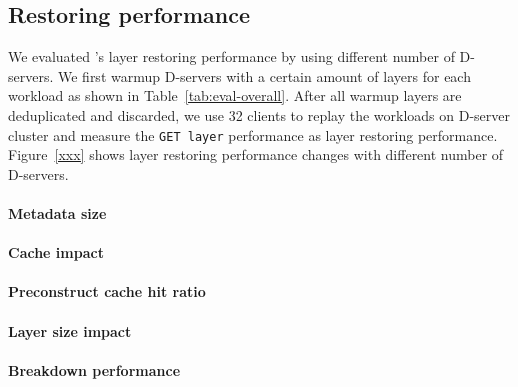 \subsection{Restoring performance}

We evaluated \sysname's layer restoring performance by using different number of D-servers.
We first warmup D-servers with a certain amount of layers for each workload as shown in Table~\ref{tab:eval-overall}.
After all warmup layers are deduplicated and discarded,
we use 32 clients to replay the workloads on D-server cluster 
and measure the \texttt{GET layer} performance as layer restoring performance.
Figure~\ref{xxx} shows layer restoring performance changes with different number of D-servers.


\paragraph{Metadata size}

\paragraph{Cache impact}

\paragraph{Preconstruct cache hit ratio}

\paragraph{Layer size impact}

\paragraph{Breakdown performance}





